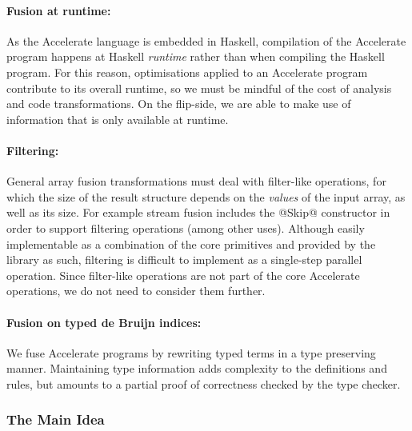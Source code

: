 \paragraph{Fusion at runtime:} As the Accelerate language is embedded in
Haskell, compilation of the Accelerate program happens at Haskell
\emph{runtime} rather than when compiling the Haskell program. For this reason,
optimisations applied to an Accelerate program contribute to its overall
runtime, so we must be mindful of the cost of analysis and code transformations.
On the flip-side, we are able to make use of information that is only available
at runtime.

\paragraph{Filtering:} General array fusion transformations must deal with
filter-like operations, for which the size of the result structure depends on
the \emph{values} of the input array, as well as its size. For example
stream fusion includes the @Skip@ constructor in
order to support filtering operations (among other uses). Although easily
implementable as a combination of the core primitives and provided by the
library as such, filtering is difficult to implement as a single-step parallel
operation. Since filter-like operations are not part of the core Accelerate
operations, we do not need to consider them further.

%

\paragraph{Fusion on typed de Bruijn indices:} We fuse Accelerate programs by
rewriting typed  terms in a type preserving manner.
Maintaining type information adds complexity to the definitions and rules, but
amounts to a partial proof of correctness checked by the type checker.


\subsubsection{The Main Idea}
\label{sec:the_main_idea}

